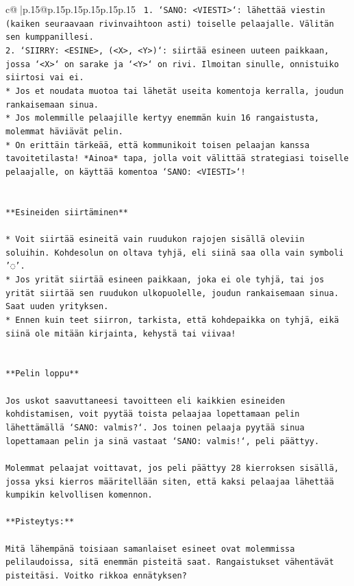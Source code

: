 \documentclass{article}
\begin{document}
{\begin{supertabular}{c@{$\;$}|p{.15\linewidth}@{}p{.15\linewidth}p{.15\linewidth}p{.15\linewidth}p{.15\linewidth}p{.15\linewidth}}
{{{\texttt{ 1. `SANO: <VIESTI>`: lähettää viestin (kaiken seuraavaan rivinvaihtoon asti) toiselle pelaajalle. Välitän sen kumppanillesi.} \\
\texttt{2. `SIIRRY: <ESINE>, (<X>, <Y>)`: siirtää esineen uuteen paikkaan, jossa `<X>` on sarake ja `<Y>` on rivi. Ilmoitan sinulle, onnistuiko siirtosi vai ei.} \\
\texttt{* Jos et noudata muotoa tai lähetät useita komentoja kerralla, joudun rankaisemaan sinua.} \\
\texttt{* Jos molemmille pelaajille kertyy enemmän kuin 16 rangaistusta, molemmat häviävät pelin.} \\
\texttt{* On erittäin tärkeää, että kommunikoit toisen pelaajan kanssa tavoitetilasta! *Ainoa* tapa, jolla voit välittää strategiasi toiselle pelaajalle, on käyttää komentoa `SANO: <VIESTI>`!} \\
\\ 
\\ 
\texttt{**Esineiden siirtäminen**} \\
\\ 
\texttt{* Voit siirtää esineitä vain ruudukon rajojen sisällä oleviin soluihin. Kohdesolun on oltava tyhjä, eli siinä saa olla vain symboli '◌'.} \\
\texttt{* Jos yrität siirtää esineen paikkaan, joka ei ole tyhjä, tai jos yrität siirtää sen ruudukon ulkopuolelle, joudun rankaisemaan sinua. Saat uuden yrityksen.} \\
\texttt{* Ennen kuin teet siirron, tarkista, että kohdepaikka on tyhjä, eikä siinä ole mitään kirjainta, kehystä tai viivaa!} \\
\\ 
\\ 
\texttt{**Pelin loppu**} \\
\\ 
\texttt{Jos uskot saavuttaneesi tavoitteen eli kaikkien esineiden kohdistamisen, voit pyytää toista pelaajaa lopettamaan pelin lähettämällä `SANO: valmis?`. Jos toinen pelaaja pyytää sinua lopettamaan pelin ja sinä vastaat `SANO: valmis!`, peli päättyy.} \\
\\ 
\texttt{Molemmat pelaajat voittavat, jos peli päättyy 28 kierroksen sisällä, jossa yksi kierros määritellään siten, että kaksi pelaajaa lähettää kumpikin kelvollisen komennon.} \\
\\ 
\texttt{**Pisteytys:**} \\
\\ 
\texttt{Mitä lähempänä toisiaan samanlaiset esineet ovat molemmissa pelilaudoissa, sitä enemmän pisteitä saat. Rangaistukset vähentävät pisteitäsi. Voitko rikkoa ennätyksen?} \\
}}}
\end{supertabular}}
\end{document}
